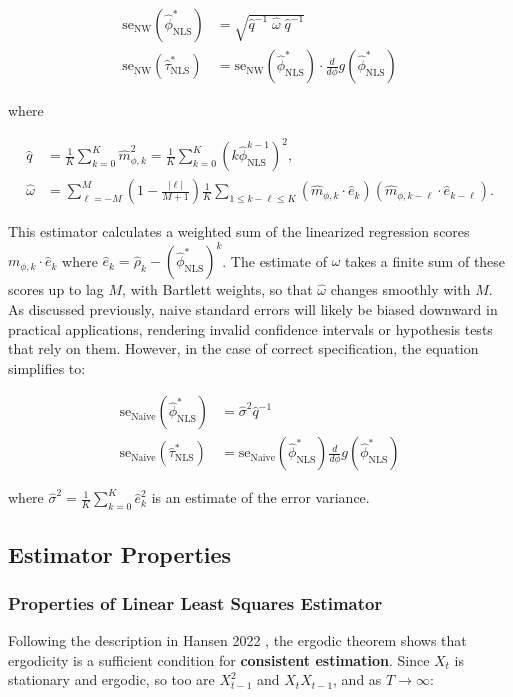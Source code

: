 \documentclass[main.tex]{subfiles}
\begin{document}
\begin{align}
\text{se}_{\text{NW}}(\hat\phi^*_{\text{NLS}}) &= \sqrt{\hat q^{-1}\;\hat\omega\; \hat q^{-1}}\\
\text{se}_{\text{NW}}(\hat\tau^*_{\text{NLS}}) &= \text{se}_{\text{NW}}(\hat\phi^*_{\text{NLS}}) \cdot \frac{d}{d\phi} g(\hat\phi^*_{\text{NLS}})
\end{align}

where

\begin{align*}
    \hat q &= \frac{1}{K} \sum_{k=0}^K \hat m_{\phi,k}^2 = \frac{1}{K} \sum_{k=0}^K (k \hat\phi_{\text{NLS}}^{k-1})^2,\\
    \hat \omega &= \sum_{\ell=-M}^M (1 - \frac{|\ell|}{M+1}) \frac{1}{K} \sum_{1 \le k - \ell \le K} (\hat m_{\phi, k} \cdot \hat e_k) (\hat m_{\phi, k-\ell} \cdot \hat e_{k-\ell}).
\end{align*}

This estimator calculates a weighted sum of the linearized regression scores $m_{\phi, k} \cdot \hat e_k$ where $\hat e_k = \hat\rho_k - (\hat\phi^*_{\text{NLS}})^k$. The estimate of $\hat\omega$ takes a finite sum of these scores up to lag $M$, with Bartlett weights, so that $\hat\omega$ changes smoothly with $M$.\\

As discussed previously, naive standard errors will likely be biased downward in practical applications, rendering invalid confidence intervals or hypothesis tests that rely on them. However, in the case of correct specification, the equation simplifies to:

\begin{align} 
    \text{se}_\text{Naive}(\hat\phi^*_{\text{NLS}}) &= \hat\sigma^2 \hat q^{-1}\\
    \text{se}_\text{Naive}(\hat\tau^*_{\text{NLS}}) &= \text{se}_{\text{Naive}}(\hat\phi^*_{\text{NLS}}) \frac{d}{d\phi} g(\hat\phi^*_{\text{NLS}})
\end{align}

where $\hat\sigma^2 = \frac{1}{K} \sum_{k=0}^K \hat e_k^2$ is an estimate of the error variance.\\

\subsection{Estimator Properties}
\subsubsection{Properties of Linear Least Squares Estimator}
Following the description in Hansen 2022 \cite{hansen_econometrics_2022}, the ergodic theorem shows that ergodicity is a sufficient condition for \textbf{consistent estimation}. Since $X_t$ is stationary and ergodic, so too are $X_{t-1}^2$ and $X_t X_{t-1}$, and as $T \to \infty$:
\end{document}
